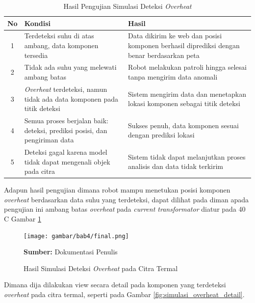\begin{table}[H]
    \centering
    \caption{Hasil Pengujian Simulasi Deteksi \emph{Overheat}}
    \label{tab:simulasi_overheat}
    \begin{tabular}{|c|p{6cm}|p{5.5cm}|}
    \hline
    \textbf{No} & \textbf{Kondisi} & \textbf{Hasil} \\ \hline
    1 & Terdeteksi suhu di atas ambang, data komponen tersedia & Data dikirim ke web dan posisi komponen berhasil diprediksi dengan benar berdasarkan peta \\ \hline
    2 & Tidak ada suhu yang melewati ambang batas & Robot melakukan patroli hingga selesai tanpa mengirim data anomali \\ \hline
    3 & \emph{Overheat} terdeteksi, namun tidak ada data komponen pada titik deteksi & Sistem mengirim data dan menetapkan lokasi komponen sebagai titik deteksi \\ \hline
    4 & Semua proses berjalan baik: deteksi, prediksi posisi, dan pengiriman data & Sukses penuh, data komponen sesuai dengan prediksi lokasi \\ \hline
    5 & Deteksi gagal karena model tidak dapat mengenali objek pada citra & Sistem tidak dapat melanjutkan proses analisis dan data tidak terkirim \\ \hline
    \end{tabular}
    \end{table}

    Adapun hasil pengujian dimana robot mampu menetukan posisi komponen \emph{overheat}  berdasarkan data suhu yang terdeteksi, dapat dilihat pada diman apada pengujian ini ambang batas \emph{overheat} pada \emph{current transformator} diatur pada 40 C Gambar \ref{fig:simulasi_overheat}

    \begin{figure}[H]
    \centering
    \texttt{[image: gambar/bab4/final.png]}
    \caption{Hasil Simulasi Deteksi \emph{Overheat} pada Citra Termal}
    \label{fig:simulasi_overheat}
    \footnotesize{\textbf{Sumber:} Dokumentasi Penulis}
    \end{figure}

    Dimana dija dilakukan view secara detail pada komponen yang terdeteksi \emph{overheat} pada citra termal, seperti pada Gambar \ref{fig:simulasi_overheat_detail}.

